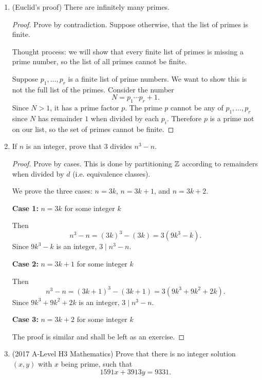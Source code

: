 \documentclass[12pt,a4 paper]{article}
\begin{document}
\begin{enumerate}
\begin{proof}
Take $n=101!+2$. Then $n$ has a factor of $2$ and hence is composite. Similarly, $n+k=101!+(k+2)$ has a factor $k+2$ and hence is composite for $k=1,2,\dots,99$.

Hence the existential statement is proven.
\end{proof}

\item (Euclid's proof) There are infinitely many primes.

\begin{proof}
Prove by contradiction. Suppose otherwise, that the list of primes is finite.

Thought process: we will show that every finite list of primes is missing a prime number, so the list of all primes cannot be finite.

Suppose $p_1,\dots,p_r$ is a finite list of prime numbers. We want to show this is not the full list of the primes. Consider the number
\[ N=p_1\cdots p_r+1. \]
Since $N>1$, it has a prime factor $p$. The prime $p$ cannot be any of $p_1,\dots,p_r$ since $N$ has remainder $1$ when divided by each $p_i$. Therefore $p$ is a prime not on our list, so the set of primes cannot be finite.
\end{proof}

\item If $n$ is an integer, prove that $3$ divides $n^3-n$.

\begin{proof}
Prove by cases. This is done by partitioning $\mathbb Z$ according to remainders when divided by $d$ (i.e. equivalence classes).

We prove the three cases: $n=3k$, $n=3k+1$, and $n=3k+2$.

\textbf{Case 1:} $n=3k$ for some integer $k$

Then
\[ n^3-n=(3k)^3-(3k)=3(9k^3-k). \]
Since $9k^3-k$ is an integer, $3\mid n^3-n$.

\textbf{Case 2:} $n=3k+1$ for some integer $k$

Then
\[ n^3-n=(3k+1)^3-(3k+1)=3(9k^3+9k^2+2k). \]
Since $9k^3+9k^2+2k$ is an integer, $3\mid n^3-n$.

\textbf{Case 3:} $n=3k+2$ for some integer $k$

The proof is similar and shall be left as an exercise.
\end{proof}

\item (2017 A-Level H3 Mathematics) Prove that there is no integer solution $(x,y)$ with $x$ being prime, such that
\[ 1591x+3913y=9331. \]


\end{enumerate}
\end{document}
